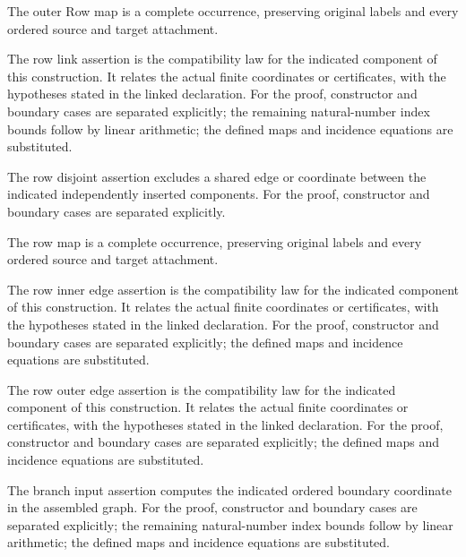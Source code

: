 The outer Row map is a complete occurrence, preserving original labels and every ordered source and target attachment.
\par{}

The row link assertion is the compatibility law for the indicated component of this construction. It relates the actual finite coordinates or certificates, with the hypotheses stated in the linked declaration.
For the proof, constructor and boundary cases are separated explicitly; the remaining natural-number index bounds follow by linear arithmetic; the defined maps and incidence equations are substituted.
\par{}

The row disjoint assertion excludes a shared edge or coordinate between the indicated independently inserted components.
For the proof, constructor and boundary cases are separated explicitly.
\par{}

The row map is a complete occurrence, preserving original labels and every ordered source and target attachment.
\par{}

The row inner edge assertion is the compatibility law for the indicated component of this construction. It relates the actual finite coordinates or certificates, with the hypotheses stated in the linked declaration.
For the proof, constructor and boundary cases are separated explicitly; the defined maps and incidence equations are substituted.
\par{}

The row outer edge assertion is the compatibility law for the indicated component of this construction. It relates the actual finite coordinates or certificates, with the hypotheses stated in the linked declaration.
For the proof, constructor and boundary cases are separated explicitly; the defined maps and incidence equations are substituted.
\par{}

The branch input assertion computes the indicated ordered boundary coordinate in the assembled graph.
For the proof, constructor and boundary cases are separated explicitly; the remaining natural-number index bounds follow by linear arithmetic; the defined maps and incidence equations are substituted.
\par{}

